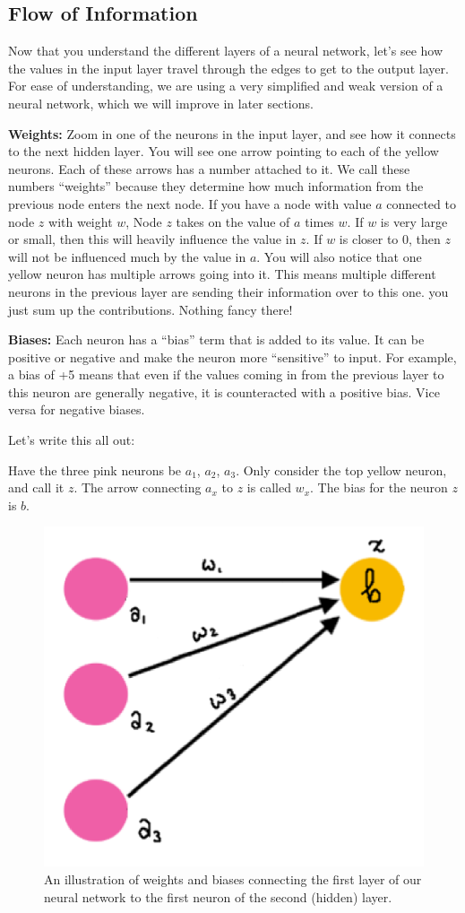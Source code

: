 \subsection{Flow of Information}
\begin{flushleft}
    \large Now that you understand the different layers of a neural network, let's see how the values in the input layer travel through the edges to get to the output layer. For ease of understanding, we are using a very simplified and weak version of a neural network, which we will improve in later sections. \break
    
    \textbf{Weights:} Zoom in one of the neurons in the input layer, and see how it connects to the next hidden layer. You will see one arrow pointing to each of the yellow neurons. Each of these arrows has a number attached to it. We call these numbers ``weights'' because they determine how much information from the previous node enters the next node. If you have a node with value $a$ connected to node $z$ with weight $w$, Node $z$ takes on the value of $a$ times $w$. If $w$ is very large or small, then this will heavily influence the value in $z$. If $w$ is closer to 0, then $z$ will not be influenced much by the value in $a$. You will also notice that one yellow neuron has multiple arrows going into it. This means multiple different neurons in the previous layer are sending their information over to this one. you just sum up the contributions. Nothing fancy there! \break
    
    \textbf{Biases:} Each neuron has a ``bias'' term that is added to its value. It can be positive or negative and make the neuron more ``sensitive'' to input. For example, a bias of +5 means that even if the values coming in from the previous layer to this neuron are generally negative, it is counteracted with a positive bias. Vice versa for negative biases. \break
    
    Let's write this all out: \break
    
    Have the three pink neurons be $a_1$, $a_2$, $a_3$. Only consider the top yellow neuron, and call it $z$. The arrow connecting $a_x$ to $z$ is called $w_x$. The bias for the neuron $z$ is $b$. 

    \begin{figure}[H]
        \centering
        \includegraphics[width=0.5\linewidth]{dl/connectivity_basic.png}
        \caption{An illustration of weights and biases connecting the first layer of our neural network to the first neuron of the second (hidden) layer.}
        \label{fig:connectivity_basic}
    \end{figure}


\end{flushleft}

